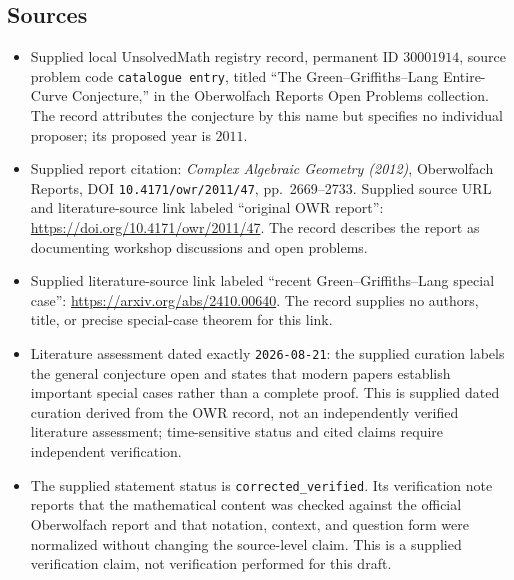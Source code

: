 \documentclass[11pt]{article}
\begin{document}
\subsection{Sources}
\begin{itemize}
\item Supplied local UnsolvedMath registry record, permanent ID \(30001914\), source problem code \texttt{catalogue entry}, titled ``The Green--Griffiths--Lang Entire-Curve Conjecture,'' in the Oberwolfach Reports Open Problems collection. The record attributes the conjecture by this name but specifies no individual proposer; its proposed year is \(2011\).
\item Supplied report citation: \emph{Complex Algebraic Geometry (2012)}, Oberwolfach Reports, DOI \texttt{10.4171/owr/2011/47}, pp.\ 2669--2733. Supplied source URL and literature-source link labeled ``original OWR report'': \url{https://doi.org/10.4171/owr/2011/47}. The record describes the report as documenting workshop discussions and open problems.
\item Supplied literature-source link labeled ``recent Green--Griffiths--Lang special case'': \url{https://arxiv.org/abs/2410.00640}. The record supplies no authors, title, or precise special-case theorem for this link.
\item Literature assessment dated exactly \texttt{2026-08-21}: the supplied curation labels the general conjecture open and states that modern papers establish important special cases rather than a complete proof. This is supplied dated curation derived from the OWR record, not an independently verified literature assessment; time-sensitive status and cited claims require independent verification.
\item The supplied statement status is \texttt{corrected\_verified}. Its verification note reports that the mathematical content was checked against the official Oberwolfach report and that notation, context, and question form were normalized without changing the source-level claim. This is a supplied verification claim, not verification performed for this draft.
\end{itemize}
\end{document}
